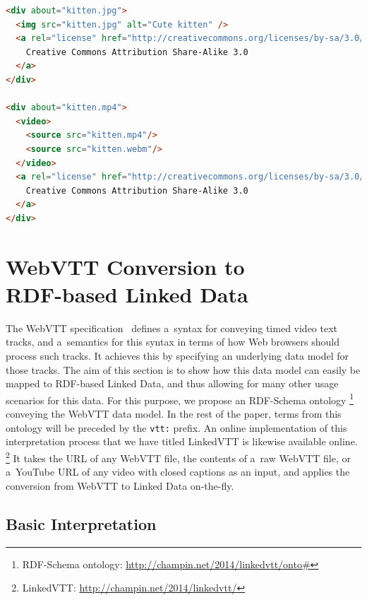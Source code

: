\documentclass{sig-alternate}
\newcommand{\inlinelistingsize}{\fontsize{8pt}{11pt}}
\let\oldurl\url
\renewcommand{\url}[1]{\inlinelistingsize\oldurl{#1}}
\newcommand{\vtt}[1]{\texttt{vtt:#1}}
\begin{document}
\begin{lstlisting}[caption={Specifying a~license for an image and attempt to do the same for a~video with two sources (the license of kitten.webm stays unclear)},
  label=listing:html-license, language=html, float=h!]
<div about="kitten.jpg">
  <img src="kitten.jpg" alt="Cute kitten" />
  <a rel="license" href="http://creativecommons.org/licenses/by-sa/3.0/">
    Creative Commons Attribution Share-Alike 3.0
  </a>
</div>

<div about="kitten.mp4">
  <video>
    <source src="kitten.mp4"/>
    <source src="kitten.webm"/>
  </video>  
  <a rel="license" href="http://creativecommons.org/licenses/by-sa/3.0/">
    Creative Commons Attribution Share-Alike 3.0
  </a>
</div>
\end{lstlisting}

\section{WebVTT Conversion to\\ RDF-based Linked Data}
\label{sec:webvtt-conversion-to-rdf-based-linked-data}

The WebVTT specification~\cite{pfeiffer2013webvtt} defines a~syntax
for conveying timed video text tracks,
and a~semantics for this syntax in terms of how
Web browsers should process such tracks.
It achieves this by specifying an underlying data model for those tracks.
The aim of this section is to show
how this data model can easily be mapped to RDF-based Linked Data,
and thus allowing for many other usage scenarios for this data.
For this purpose, we propose an RDF-Schema ontology%
\footnote{RDF-Schema ontology:
\url{http://champin.net/2014/linkedvtt/onto\#}}
conveying the WebVTT data model.
In the rest of the paper, terms from this ontology
will be preceded by the \vtt{} prefix.
An online implementation of this interpretation process
that we have titled LinkedVTT is likewise available online.%
\footnote{LinkedVTT: \url{http://champin.net/2014/linkedvtt/}}
It takes the URL of any WebVTT file, the contents of a~raw WebVTT file,
or a~YouTube URL of any video with closed captions as an input,
and applies the conversion from WebVTT to Linked Data on-the-fly.

\subsection{Basic Interpretation}
\end{document}
